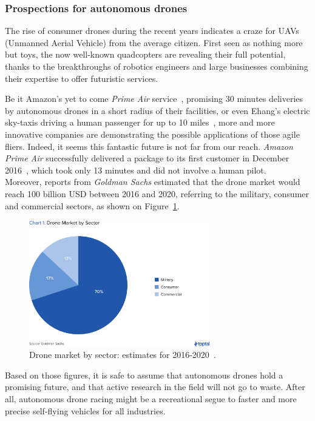 \subsubsection{Prospections for autonomous drones}
The rise of consumer drones during the recent years indicates a craze for UAVs
(Unmanned Aerial Vehicle) from the average citizen. First seen as nothing more
but toys, the now well-known quadcopters are revealing their full potential,
thanks to the breakthroughs of robotics engineers and large businesses combining
their expertise to offer futuristic services.

Be it Amazon's yet to come \emph{Prime Air} service~\cite{PrimeAir}, promising
30 minutes deliveries by autonomous drones in a short radius of their
facilities, or even Ehang's electric sky-taxis driving a human passenger for up
to 10 miles~\cite{Ehang184}, more and more innovative companies are
demonstrating the possible applications of those agile fliers.  Indeed, it seems
this fantastic future is not far from our reach. \emph{Amazon Prime Air}
successfully delivered a package to its first customer in December
2016~\cite{PrimeAirFirst}, which took only 13 minutes and did not involve a
human pilot.\\

Moreover, reports from \emph{Goldman Sachs} \cite{TopTal} estimated that the
drone market would reach 100 billion USD between 2016 and 2020, referring to
the military, consumer and commercial sectors, as shown on
Figure~\ref{fig:toptal}.\\

\begin{figure}[h]
	\centering
	\includegraphics[width=0.7\textwidth]{figure/toptal.png}
	\caption{Drone market by sector: estimates for 2016-2020~\cite{TopTal}.}
	\label{fig:toptal}
\end{figure}

Based on those figures, it is safe to assume that autonomous drones hold a
promising future, and that active research in the field will not go to waste.
After all, autonomous drone racing might be a recreational segue to faster and
more precise self-flying vehicles for all industries.
